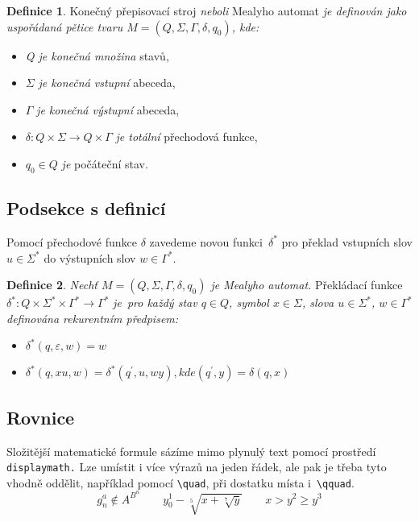 \documentclass[twocolumn, 11pt, a4paper]{article}
\theoremstyle{definition}
\newtheorem{definition}{Definice}
\theoremstyle{plain}
\begin{document}
    \begin{definition}
        \label{kon_pre_str}
        Konečný přepisovací stroj \emph{neboli} Mealyho automat \emph{je definován jako uspořádaná pětice tvaru $M = (Q, \varSigma, \varGamma, \delta, q_0)$, kde:}
        \begin{itemize}
            \item \emph{Q je konečná množina} stavů,
            \item $\varSigma$ \emph{je konečná vstupní} abeceda,
            \item $\varGamma$ \emph{je konečná výstupní} abeceda,
            \item $\delta : Q \times \varSigma \rightarrow Q \times \varGamma$ \emph{je totální} přechodová funkce,
            \item $q_0 \in Q$ \emph{je} počáteční stav.
        \end{itemize}
    \end{definition}
    
    \subsection{Podsekce s definicí}
    Pomocí přechodové funkce $\delta$ zavedeme novou funkci~$\delta^\ast$ pro překlad vstupních slov $u \in \varSigma^\ast$ do výstupních slov $w \in \varGamma^\ast$.
    \begin{definition}
        \label{def_mealyho_automat}
         \emph{Nechť $M = (Q, \varSigma, \varGamma, \delta, q_0)$ je Mealyho automat.} Překládací funkce ${\delta^\ast : Q \times \varSigma^\ast \times \varGamma^\ast \rightarrow \varGamma^\ast}$ \emph{je~pro každý stav ${q \in Q}$, symbol $x \in \varSigma$, slova ${u \in \varSigma^\ast}$, ${w \in \varGamma^\ast}$ definována rekurentním předpisem:}

         \begin{itemize}
            \item $\delta^\ast(q, \varepsilon, w) = w$
            \item $\delta^\ast(q, xu, w) = \delta^\ast(q^\prime, u, wy), kde (q^\prime, y) = \delta(q, x)$
        \end{itemize}
    \end{definition}

    \subsection{Rovnice}
    Složitější matematické formule sázíme mimo plynulý text pomocí prostředí \texttt{displaymath.} Lze umístit i více výrazů na jeden řádek, ale pak je třeba tyto vhodně oddělit, například pomocí \verb|\quad|, při dostatku místa i~\verb|\qquad|.
    $$
        g^a_n \notin A^{B^n}
        \qquad
        y^1_0 - \sqrt[5]{x + \sqrt[7]{y}}
        \qquad
        x > y^2 \geq y^3
    $$
\end{document}
